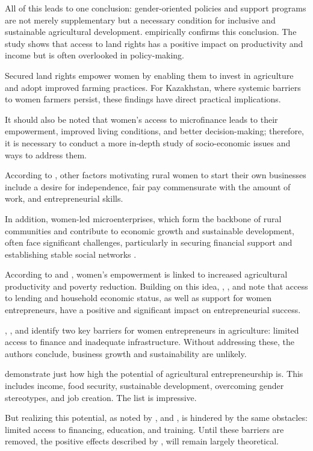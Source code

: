﻿\documentclass[pdflatex,sn-mathphys-ay]{sn-jnl}
\begin{document}
All of this leads to one conclusion: gender-oriented policies and
support programs are not merely supplementary but a necessary condition
for inclusive and sustainable agricultural development. \citet{ref20} empirically confirms this conclusion. The study shows that
access to land rights has a positive impact on productivity and income
but is often overlooked in policy-making.

Secured land rights empower women by enabling them to invest in
agriculture and adopt improved farming practices. For Kazakhstan, where
systemic barriers to women farmers persist, these findings have direct
practical implications.

It should also be noted that women's access to microfinance
\citep{ref60} leads to their empowerment, improved
living conditions, and better decision-making; therefore, it is
necessary to conduct a more in-depth study of socio-economic issues and
ways to address them.

According to \citet{ref91}, other factors
motivating rural women to start their own businesses include a desire
for independence, fair pay commensurate with the amount of work, and
entrepreneurial skills.

In addition, women-led microenterprises, which form the backbone of
rural communities and contribute to economic growth and sustainable
development, often face significant challenges, particularly in securing
financial support and establishing stable social networks \citep{ref14}.

According to \citet{ref68} and \citet{ref46},
women's empowerment is linked to increased agricultural productivity and
poverty reduction. Building on this idea, \citet{ref94},
\citet{ref88}, and \citet{ref16} note that
access to lending and household economic status, as well as support for
women entrepreneurs, have a positive and significant impact on
entrepreneurial success.

\citet{ref35}, \citet{ref23}, and \citet{ref62} identify two key barriers for women entrepreneurs in
agriculture: limited access to finance and inadequate infrastructure.
Without addressing these, the authors conclude, business growth and
sustainability are unlikely.

\citet{ref99} demonstrate just how high the potential of
agricultural entrepreneurship is. This includes income, food security,
sustainable development, overcoming gender stereotypes, and job
creation. The list is impressive.

But realizing this potential, as noted by \citet{ref25},
and \citet{ref85}, is hindered by the same obstacles:
limited access to financing, education, and training. Until these
barriers are removed, the positive effects described by \citet{ref99}, will remain largely theoretical.
\end{document}
